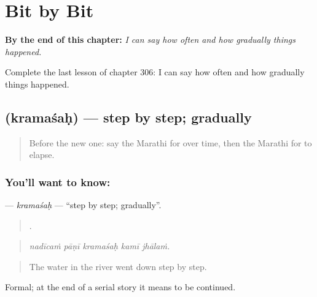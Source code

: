 
\chapter{Bit by Bit}
\label{ch:mr-bit-by-bit}

\begin{chapteropening}
\textbf{By the end of this chapter:} \emph{I can say how often and how gradually things happened.}

Complete the last lesson of chapter 306: I can say how often and how gradually things happened.
\end{chapteropening}

\section[\texorpdfstring{\mr{क्रमशः} (kramaśaḥ)}{क्रमशः (kramaśaḥ)}]{ (kramaśaḥ) — step by step; gradually}

\label{lesson:MR-C306-kramasah}



\begin{quote}
Before the new one: say the Marathi for over time, then the Marathi for to elapse.
\end{quote}

\subsection*{You'll want to know: }
\textbf{} — \emph{kramaśaḥ} — \textquotedblleft{}step by step; gradually\textquotedblright{}.

\begin{quote}
    .
\end{quote}

\begin{quote}
\emph{nadīcaṁ pāṇī kramaśaḥ kamī jhālaṁ.}
\end{quote}

\begin{quote}
The water in the river went down step by step.
\end{quote}

Formal; at the end of a serial story it means to be continued.

